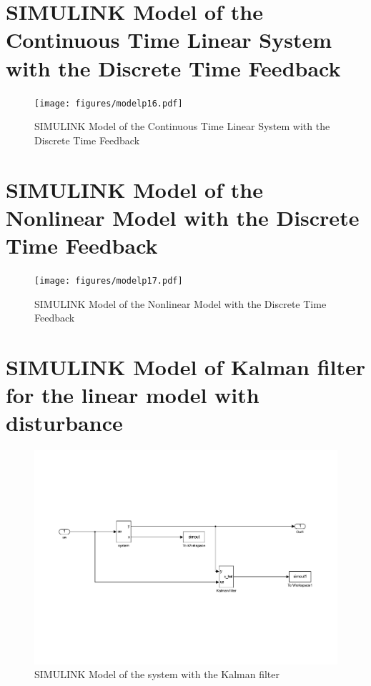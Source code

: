 \documentclass[12pt,a4paper,fleqn, onesside]{report}
\begin{document}
\chapter{SIMULINK Model of the Continuous Time Linear System with the Discrete Time Feedback}
\label{AppP16}
\begin{figure}[H]
 \centering 
 \texttt{[image: figures/modelp16.pdf]}
 \caption{SIMULINK Model of the Continuous Time Linear System with the Discrete Time Feedback}
\label{fig:modelp16}
\end{figure}

\chapter{SIMULINK Model of the Nonlinear Model with the Discrete Time Feedback}
\label{AppP17}
\begin{figure}[H]
 \centering 
 \texttt{[image: figures/modelp17.pdf]}
 \caption{SIMULINK Model of the Nonlinear Model with the Discrete Time Feedback}
\label{fig:modelp17}
\end{figure}

\chapter{SIMULINK Model of Kalman filter for the linear model with disturbance}
\label{AppP22}
\begin{figure}[H]
 \centering 
 \includegraphics[trim=1cm 0cm 2cm 0cm, clip=true, totalheight=0.35\textheight, angle=0]{figures/modelP22.pdf}
 \caption{SIMULINK Model of the system with the Kalman filter}
\end{figure}
\end{document}
